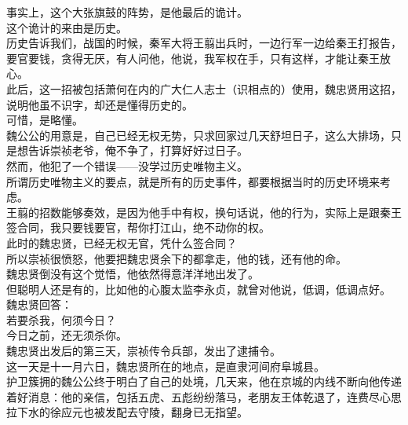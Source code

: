 \begin{multicols}{\theparacolNo}
事实上，这个大张旗鼓的阵势，是他最后的诡计。\\

这个诡计的来由是历史。\\

历史告诉我们，战国的时候，秦军大将王翦出兵时，一边行军一边给秦王打报告，要官要钱，贪得无厌，有人问他，他说，我军权在手，只有这样，才能让秦王放心。\\

此后，这一招被包括萧何在内的广大仁人志士（识相点的）使用，魏忠贤用这招，说明他虽不识字，却还是懂得历史的。\\

可惜，是略懂。\\

魏公公的用意是，自己已经无权无势，只求回家过几天舒坦日子，这么大排场，只是想告诉崇祯老爷，俺不争了，打算好好过日子。\\

然而，他犯了一个错误——没学过历史唯物主义。\\

所谓历史唯物主义的要点，就是所有的历史事件，都要根据当时的历史环境来考虑。\\

王翦的招数能够奏效，是因为他手中有权，换句话说，他的行为，实际上是跟秦王签合同，我只要钱要官，帮你打江山，绝不动你的权。\\

此时的魏忠贤，已经无权无官，凭什么签合同？\\

所以崇祯很愤怒，他要把魏忠贤余下的都拿走，他的钱，还有他的命。\\

魏忠贤倒没有这个觉悟，他依然得意洋洋地出发了。\\

但聪明人还是有的，比如他的心腹太监李永贞，就曾对他说，低调，低调点好。\\

魏忠贤回答：\\

若要杀我，何须今日？\\

今日之前，还无须杀你。\\

魏忠贤出发后的第三天，崇祯传令兵部，发出了逮捕令。\\

这一天是十一月六日，魏忠贤所在的地点，是直隶河间府阜城县。\\

护卫簇拥的魏公公终于明白了自己的处境，几天来，他在京城的内线不断向他传递着好消息：他的亲信，包括五虎、五彪纷纷落马，老朋友王体乾退了，连费尽心思拉下水的徐应元也被发配去守陵，翻身已无指望。\\


\end{multicols}
